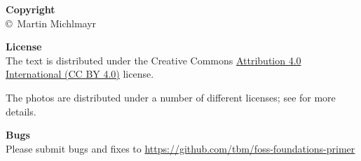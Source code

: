\documentclass[
	a4paper,
	fontsize=12pt,
	twoside=false,
	numbers=noenddot,
]{kaobook}
\begin{document}
\backmatter

\clearpage
\thispagestyle{empty}

\vspace*{.6\textheight}

\textbf{Copyright}\\
\copyright\ Martin Michlmayr

\medskip

\textbf{License}\\
The text is distributed under the Creative Commons \href{https://creativecommons.org/licenses/by/4.0/}{Attribution 4.0 International (CC BY 4.0)} license.

The photos are distributed under a number of different licenses; see  for more details.

\medskip

\textbf{Bugs}\\
Please submit bugs and fixes to \href{https://github.com/tbm/foss-foundations-primer/}{https://github.com/tbm/foss-foundations-primer}
\end{document}
